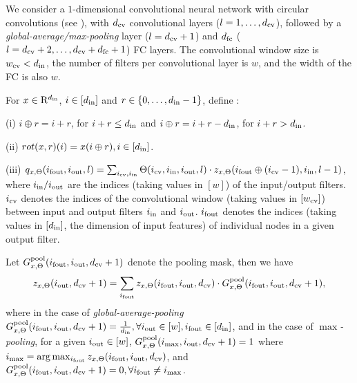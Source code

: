 We consider a $1$-dimensional convolutional neural network with circular convolutions (see ), with $d_{\text{cv}}$ convolutional layers ($l=1,\ldots,d_{\text{cv}}$), followed by a \emph{global-average/max-pooling} layer ($l=d_{\text{cv}}+1$) and $d_{\text{fc}}$ ($l=d_{\text{cv}}+2,\ldots,d_{\text{cv}}+d_{\text{fc}}+1$) FC  layers. The convolutional window size is $w_{\text{cv}}<d_{\text{in}}$, the number of filters per convolutional layer is $w$, and the width of the FC is also $w$. 
\begin{definition}
For $x\in\mathrm{R}^{d_{\text{in}}}$, $i\in[d_{\text{in}}]$ and $r\in\{0,\ldots,d_{\text{in}}-1\}$, define :

(i) $i\oplus r = i+r$, for $i+r \leq d_{\text{in}}$ and $i\oplus r =i+r-d_{\text{in}}$, for $i+r>d_{\text{in}}$.

(ii) $rot(x,r)(i)=x(i\oplus r), i\in[d_{\text{in}}]$.

(iii) $q_{x,\Theta}(i_{\text{fout}},i_{\text{out}},l)=\sum_{i_{\text{cv}},i_{\text{in}}}\Theta(i_{\text{cv}},i_{\text{in}},i_{\text{out}},l)\cdot z_{x,\Theta}(i_{\text{fout}}\oplus (i_{\text{cv}}-1),i_{\text{in}},l-1)$, where $i_{\text{in}}/i_{\text{out}}$ are the indices (taking values in $[w]$) of the input/output filters. $i_{\text{cv}}$ denotes the indices of the convolutional window (taking values in $[w_{\text{cv}}]$) between input and output filters $i_{\text{in}}$ and $i_{\text{out}}$. $i_{\text{fout}}$ denotes the indices (taking values in $[d_{\text{in}}]$, the dimension of input features) of individual nodes in a given output filter.
\end{definition}
\begin{definition}[Pooling]
Let $G^{\text{pool}}_{x,\Theta}(i_{\text{fout}},i_{\text{out}},d_{\text{cv}}+1)$ denote the pooling mask, then we have
\begin{align*}
z_{x,\Theta}(i_{\text{out}}, d_{\text{cv}}+1) =\sum_{i_{\text{fout}}} z_{x,\Theta}(i_{\text{fout}},i_{\text{out}},d_{\text{cv}})\cdot G^{\text{pool}}_{x,\Theta}(i_{\text{fout}},i_{\text{out}},d_{\text{cv}}+1),
\end{align*}
where in the case of \emph{global-average-pooling} $G^{\text{pool}}_{x,\Theta}(i_{\text{fout}},i_{\text{out}},d_{\text{cv}}+1)=\frac{1}{d_{\text{in}}},\forall i_{\text{out}}\in[w], i_{\text{fout}}\in[d_{\text{in}}]$, and in the case of \emph{$\max$-pooling},  
for a given $i_{\text{out}}\in[w]$, $G^{\text{pool}}_{x,\Theta}(i_{\max},i_{\text{out}},d_{\text{cv}}+1)=1$ where $i_{\max}=\arg\max_{i_{\text{fout}}}z_{x,\Theta}(i_{\text{fout}},i_{\text{out}},d_{\text{cv}})$, and $G^{\text{pool}}_{x,\Theta}(i_{\text{fout}},i_{\text{out}},d_{\text{cv}}+1)=0,\forall i_{\text{fout}}\neq i_{\max}$.
\end{definition}

